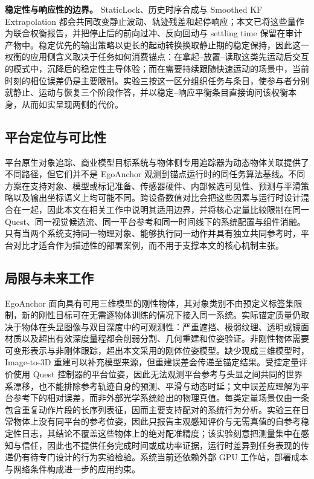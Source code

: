 \documentclass[review]{vgtc}
\begin{document}
\textbf{稳定性与响应性的边界。} StaticLock、历史时序合成与 Smoothed KF Extrapolation 都会共同改变静止波动、轨迹残差和起停响应；本文已将这些量作为联合权衡报告，并把停止后的前向过冲、反向回动与 settling time 保留在审计产物中。稳定优先的输出策略以更长的起动转换换取静止期的稳定保持，因此这一权衡的应用侧含义取决于任务如何消费锚点：在拿起--放置--读取这类先运动后交互的模式中，沉降后的稳定性主导体验；而在需要持续跟随快速运动的场景中，当前时刻的相位误差仍是主要限制。实验三按这一区分组织任务与条目，使参与者分别就静止、运动与恢复三个阶段作答，并以稳定--响应平衡条目直接询问该权衡本身，从而如实呈现两侧的代价。

\subsection{平台定位与可比性}

平台原生对象追踪、商业模型目标系统与物体侧专用追踪器为动态物体关联提供了不同路径，但它们并不是 EgoAnchor 观测到锚点运行时的同任务算法基线。不同方案在支持对象、模型或标记准备、传感器硬件、内部候选可见性、预测与平滑策略以及输出坐标语义上均可能不同。跨设备数值对比会把这些因素与运行时设计混合在一起，因此本文在相关工作中说明其适用边界，并将核心定量比较限制在同一 Quest、同一视觉候选流、同一平台参考和同一时间线下的系统配置与组件消融。只有当两个系统支持同一物理对象、能够执行同一动作并具有独立共同参考时，平台对比才适合作为描述性的部署案例，而不用于支撑本文的核心机制主张。

\subsection{局限与未来工作}


EgoAnchor 面向具有可用三维模型的刚性物体，其对象类别不由预定义标签集限制，新的刚性目标可在无需逐物体训练的情况下接入同一系统。实际锚定质量仍取决于物体在头显图像与双目深度中的可观测性：严重遮挡、极弱纹理、透明或镜面材质以及超出有效深度量程都会削弱分割、几何重建和位姿验证。非刚性物体需要可变形表示与非刚体跟踪，超出本文采用的刚体位姿模型。缺少现成三维模型时，Image-to-3D 重建可以补充模型来源，但重建误差会传递至锚定结果。受控定量评价使用 Quest 控制器的平台位姿，因此无法观测平台参考与头显之间共同的世界系漂移，也不能排除参考轨迹自身的预测、平滑与动态时延；文中误差应理解为平台参考下的相对误差，而非外部光学系统给出的物理真值。每类定量场景仅由一条包含重复动作片段的长序列表征，因而主要支持配对的系统行为分析。实验三在日常物体上没有同平台的参考位姿，因此只报告主观感知评价与无需真值的自参考稳定性日志，其结论不覆盖这些物体上的绝对配准精度；该实验刻意把测量集中在感知与信任，因此也不提供任务完成时间或成功率证据，运行时差异到任务表现的传递仍有待专门设计的行为实验检验。系统当前还依赖外部 GPU 工作站，部署成本与网络条件构成进一步的应用约束。
\end{document}

